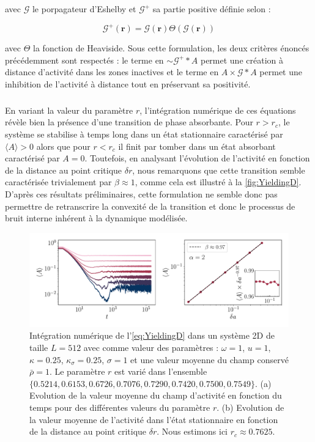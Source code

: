 \noindent avec $\mathcal{G}$ le porpagateur d'Eshelby et $\mathcal{G}^+$ sa partie positive définie selon :

\begin{equation}
	\mathcal{G}^+(\mathbf{r}) = \mathcal{G}(\mathbf{r})\Theta\left(\mathcal{G}(\mathbf{r})\right)
\end{equation}

\noindent avec $\Theta$ la fonction de Heaviside. Sous cette formulation, les deux critères énoncés précédemment sont respectés : le terme en $\sim \mathcal{G}^+\ast A$ permet une création à distance d'activité dans les zones inactives et le terme en $A\times \mathcal{G}\ast A$ permet une inhibition de l'activité à distance tout en préservant sa positivité.

\subparagraph{}En variant la valeur du paramètre $r$, l'intégration numérique de ces équations révèle bien la présence d'une transition de phase absorbante. Pour $r>r_c$, le système se stabilise à temps long dans un état stationnaire caractérisé par $\langle A \rangle > 0$ alors que pour $r<r_c$ il finit par tomber dans un état absorbant caractérisé par $A = 0$. Toutefois, en analysant l'évolution de l'activité en fonction de la distance au point critique $\delta r$, nous remarquons que cette transition semble caractérisée trivialement par $\beta \approx 1$, comme cela est illustré à la \autoref{fig:YieldingD}. D'après ces résultats préliminaires, cette formulation ne semble donc pas permettre de retranscrire la convexité de la transition et donc le processus de bruit interne inhérent à la dynamique modélisée.

\begin{figure}[h]
	\centering
	\includegraphics[width=\textwidth]{Chapitre5/Figures/YieldingD.pdf}
	\caption{Intégration numérique de l'\autoref{eq:YieldingD} dans un système 2D de taille $L=512$ avec comme valeur des paramètres : $\omega = 1$, $u = 1$, $\kappa = 0.25$, $\kappa_\sigma = 0.25$, $\sigma = 1$ et une valeur moyenne du champ conservé $\bar{\rho} = 1$. Le paramètre $r$ est varié dans l'ensemble $\{ 0.5214,  0.6153, 0.6726, 0.7076, 0.7290, 0.7420, 0.7500, 0.7549\}$. (a) Evolution de la valeur moyenne du champ d'activité en fonction du temps pour des différentes valeurs du paramètre $r$. (b) Evolution de la valeur moyenne de l'activité dans l'état stationnaire en fonction de la distance au point critique $\delta r$. Nous estimons ici $r_c \approx 0.7625$.}
	\label{fig:YieldingD}
\end{figure}


